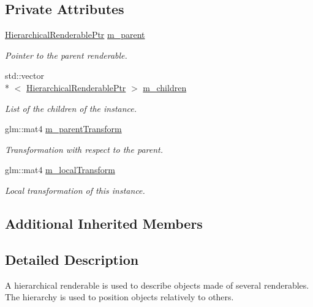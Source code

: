 \subsection*{Private Attributes}
\begin{DoxyCompactItemize}
\item 
\hyperlink{HierarchicalRenderable_8hpp_a9de1dda7f7ef0bca09b721bdb133964a}{Hierarchical\+Renderable\+Ptr} \hyperlink{classHierarchicalRenderable_a8549e3830ff55e5f9ce5d6335421a207}{m\+\_\+parent}
\begin{DoxyCompactList}\small\item\em Pointer to the parent renderable. \end{DoxyCompactList}\item 
std\+::vector\\*
$<$ \hyperlink{HierarchicalRenderable_8hpp_a9de1dda7f7ef0bca09b721bdb133964a}{Hierarchical\+Renderable\+Ptr} $>$ \hyperlink{classHierarchicalRenderable_a0e3d2a642ba4d2ea58c595a1532a6c8a}{m\+\_\+children}
\begin{DoxyCompactList}\small\item\em List of the children of the instance. \end{DoxyCompactList}\item 
glm\+::mat4 \hyperlink{classHierarchicalRenderable_a03c1fee357c0148132468224d3480d92}{m\+\_\+parent\+Transform}
\begin{DoxyCompactList}\small\item\em Transformation with respect to the parent. \end{DoxyCompactList}\item 
glm\+::mat4 \hyperlink{classHierarchicalRenderable_a467e3ba997e6d98af60033fb74333c37}{m\+\_\+local\+Transform}
\begin{DoxyCompactList}\small\item\em Local transformation of this instance. \end{DoxyCompactList}\end{DoxyCompactItemize}
\subsection*{Additional Inherited Members}


\subsection{Detailed Description}
A hierarchical renderable is used to describe objects made of several renderables. The hierarchy is used to position objects relatively to others.

